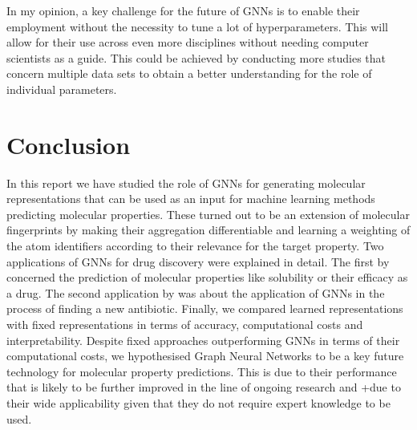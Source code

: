 In my opinion, a key challenge for the future of GNNs is to enable their employment without the necessity to tune a lot of hyperparameters. This will allow for their use across even more disciplines without needing computer scientists as a guide. This could be achieved by conducting more studies that concern multiple data sets to obtain a better understanding for the role of individual parameters.  
\section{Conclusion}
In this report we have studied the role of GNNs for generating molecular representations that can be used as an input for machine learning methods predicting molecular properties. These turned out to be an extension of molecular fingerprints by making their aggregation differentiable and learning a weighting of the atom identifiers according to their relevance for the target property.
Two applications of GNNs for drug discovery were explained in detail. The first by \cite{duvenaud2015convolutional} concerned the prediction of molecular properties like solubility or their efficacy as a drug. The second application by \cite{STOKES2020688} was about the application of GNNs in the process of finding a new antibiotic. 
Finally, we compared learned representations with fixed representations in terms of accuracy, computational costs and interpretability. Despite fixed approaches outperforming GNNs in terms of their computational costs, we hypothesised Graph Neural Networks to be a key future technology for molecular property predictions. This is due to their performance that is likely to be further improved in the line of ongoing research and +due to their wide applicability given that they do not require expert knowledge to be used. 